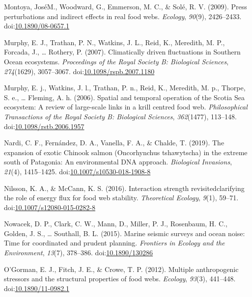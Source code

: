 \documentclass[
]{article}
\newlength{\cslhangindent}
\newlength{\cslentryspacingunit} %
\newenvironment{CSLReferences}[2] %
 {%
  \setlength{\parindent}{0pt}
  \ifodd #1
  \let\oldpar\par
  \def\par{\hangindent=\cslhangindent\oldpar}
  \fi
  \setlength{\parskip}{#2\cslentryspacingunit}
 }%
 {}
\begin{document}
\begin{CSLReferences}{1}{0}
\leavevmode{}%
Montoya, JoséM., Woodward, G., Emmerson, M. C., \& Solé, R. V. (2009).
Press perturbations and indirect effects in real food webs.
\emph{Ecology}, \emph{90}(9), 2426--2433.
doi:\href{https://doi.org/10.1890/08-0657.1}{10.1890/08-0657.1}

\leavevmode{}%
Murphy, E. J., Trathan, P. N., Watkins, J. L., Reid, K., Meredith, M.
P., Forcada, J., \ldots{} Rothery, P. (2007). Climatically driven
fluctuations in {Southern Ocean} ecosystems. \emph{Proceedings of the
Royal Society B: Biological Sciences}, \emph{274}(1629), 3057--3067.
doi:\href{https://doi.org/10.1098/rspb.2007.1180}{10.1098/rspb.2007.1180}

\leavevmode{}%
Murphy, E. j., Watkins, J. l., Trathan, P. n., Reid, K., Meredith, M.
p., Thorpe, S. e., \ldots{} Fleming, A. h. (2006). Spatial and temporal
operation of the {Scotia Sea} ecosystem: A review of large-scale links
in a krill centred food web. \emph{Philosophical Transactions of the
Royal Society B: Biological Sciences}, \emph{362}(1477), 113--148.
doi:\href{https://doi.org/10.1098/rstb.2006.1957}{10.1098/rstb.2006.1957}

\leavevmode{}%
Nardi, C. F., Fernández, D. A., Vanella, F. A., \& Chalde, T. (2019).
The expansion of exotic {Chinook} salmon ({Oncorhynchus} tshawytscha) in
the extreme south of {Patagonia}: An environmental {DNA} approach.
\emph{Biological Invasions}, \emph{21}(4), 1415--1425.
doi:\href{https://doi.org/10.1007/s10530-018-1908-8}{10.1007/s10530-018-1908-8}

\leavevmode{}%
Nilsson, K. A., \& McCann, K. S. (2016). Interaction strength
revisited\textemdash clarifying the role of energy flux for food web
stability. \emph{Theoretical Ecology}, \emph{9}(1), 59--71.
doi:\href{https://doi.org/10.1007/s12080-015-0282-8}{10.1007/s12080-015-0282-8}

\leavevmode{}%
Nowacek, D. P., Clark, C. W., Mann, D., Miller, P. J., Rosenbaum, H. C.,
Golden, J. S., \ldots{} Southall, B. L. (2015). Marine seismic surveys
and ocean noise: Time for coordinated and prudent planning.
\emph{Frontiers in Ecology and the Environment}, \emph{13}(7), 378--386.
doi:\href{https://doi.org/10.1890/130286}{10.1890/130286}

\leavevmode{}%
O'Gorman, E. J., Fitch, J. E., \& Crowe, T. P. (2012). Multiple
anthropogenic stressors and the structural properties of food webs.
\emph{Ecology}, \emph{93}(3), 441--448.
doi:\href{https://doi.org/10.1890/11-0982.1}{10.1890/11-0982.1}


\end{CSLReferences}
\end{document}
